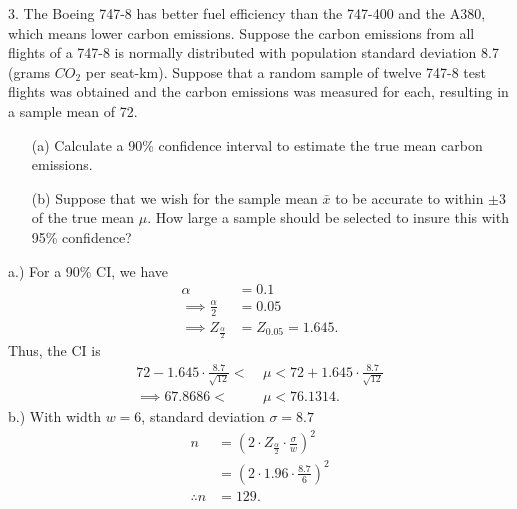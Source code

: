 \documentclass{report}
\begin{document}
\pagebreak \bigbreak \noindent 
\begin{mdframed}
3. The Boeing 747-8 has better fuel efficiency than the 747-400 and the A380, which means lower carbon emissions. Suppose the carbon emissions from all flights of a 747-8 is normally distributed with population standard deviation 8.7 (grams $CO_2$ per seat-km). Suppose that a random sample of twelve 747-8 test flights was obtained and the carbon emissions was measured for each, resulting in a sample mean of 72.
\begin{itemize}
    \item[(a)] Calculate a 90\% confidence interval to estimate the true mean carbon emissions.
    \item[(b)] Suppose that we wish for the sample mean $\bar{x}$ to be accurate to within $\pm 3$ of the true mean $\mu$. How large a sample should be selected to insure this with 95\% confidence?
\end{itemize}
\end{mdframed}
\bigbreak \noindent 
a.) For a 90\% CI, we have
\begin{align*}
    \alpha &= 0.1 \\
    \implies \frac{\alpha}{2} &= 0.05 \\
    \implies Z_{\frac{\alpha}{2}} &= Z_{0.05} = 1.645
.\end{align*}
Thus, the CI is 
\begin{align*}
    72 - 1.645 \cdot \frac{8.7}{\sqrt{12}} <\ &\mu < 72 + 1.645 \cdot \frac{8.7}{\sqrt{12}} \\
    \implies 67.8686 <\ &\mu < 76.1314
.\end{align*}
\bigbreak \noindent 
b.) With width $w=6$, standard deviation $\sigma=8.7$
\begin{align*}
    n &= \left(2 \cdot Z_{\frac{\alpha}{2}} \cdot \frac{\sigma}{w}\right)^{2} \\
    &=\left(2 \cdot 1.96 \cdot \frac{8.7}{6}\right)^{2} \\
    \therefore n&=129
.\end{align*}
\end{document}
